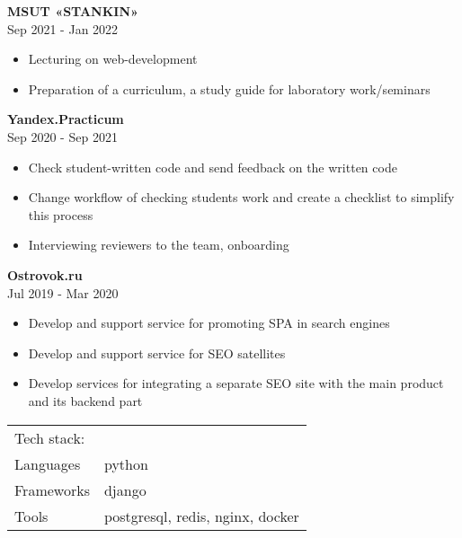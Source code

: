 \documentclass[a4paper]{article}
\begin{document}
\textbf{MSUT «STANKIN»} \\
 \hfill Sep 2021 - Jan 2022\\
\begin{itemize}[leftmargin=16pt,itemsep=0pt,topsep=0pt,label={-}]
    \item Lecturing on web-development
    \item Preparation of a curriculum, a study guide for laboratory work/seminars
\end{itemize}
\vspace{\baselineskip}

\textbf{Yandex.Practicum} \\
 \hfill Sep 2020 - Sep 2021\\
\begin{itemize}[leftmargin=16pt,itemsep=0pt,topsep=0pt,label={-}]
    \item Check student-written code and send feedback on the written code
    \item Change workflow of checking student\textquotesingle{}s work and create a checklist to simplify this process
    \item Interviewing reviewers to the team, onboarding
\end{itemize}
\vspace{\baselineskip}

\textbf{Ostrovok.ru} \\
 \hfill Jul 2019 - Mar 2020\\
\begin{itemize}[leftmargin=16pt,itemsep=0pt,topsep=-8pt,label={-}]
    \item Develop and support service for promoting SPA in search engines
    \item Develop and support service for SEO satellites
    \item Develop services for integrating a separate SEO site with the main product and its backend part
\end{itemize}
\begin{table}[h!]
    \begin{tabular}{ l l }
        Tech stack:& \\
        Languages  & python \\
        Frameworks & django \\
        Tools      & postgresql, redis, nginx, docker \\
    \end{tabular}
\end{table}
\end{document}
